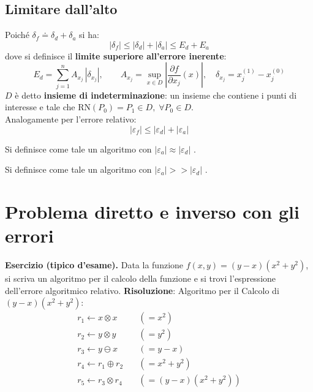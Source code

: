 \documentclass[12pt,a4paper,]{report}
\begin{document}
\subsection{Limitare dall'alto}

Poiché $\delta_f \doteq \delta_d + \delta_a$ si ha:
\[
|\delta_f| \leq |\delta_d| + |\delta_a| \leq E_d + E_a
\]
dove si definisce il \textbf{limite superiore all'errore inerente}:
\[
E_d = \sum_{j=1}^{n} A_{x_j}\,|\delta_{x_j}|,
\qquad
A_{x_j} = \sup_{x \in D}\left|\frac{\partial f}{\partial x_j}(x)\right|,
\quad
\delta_{x_j} = x_j^{(1)} - x_j^{(0)}
\]
$D$ è detto \textbf{insieme di indeterminazione}: un insieme che contiene i
punti di interesse e tale che $\mathrm{RN}(P_0) = P_1 \in D,\; \forall P_0 \in D$.
\\
Analogamente per l'errore relativo:
\[
|\varepsilon_f| \leq |\varepsilon_d| + |\varepsilon_a|
\]

\begin{definizione}
    Si definisce come tale un algoritmo con
    $
    |\varepsilon_a| \approx |\varepsilon_d|
    $
    .
\end{definizione}
\begin{definizione}
    Si definisce come tale un algoritmo con
    $
    |\varepsilon_a| >> |\varepsilon_d|
    $
    .
\end{definizione}


\begin{lezione}
    [Lezione 3 04/03]
\end{lezione}

\section{Problema diretto e inverso con gli errori}

\textbf{Esercizio (tipico d'esame).}
Data la funzione $f(x,y) = (y-x)(x^2+y^2)$, si scriva un algoritmo per il calcolo della funzione e si trovi l'espressione dell'errore algoritmico relativo.
\noindent
\textbf{Risoluzione}: Algoritmo per il Calcolo di $(y-x)(x^2+y^2)$:
\[
\begin{array}{ll}
r_1 \leftarrow x \otimes x & \quad (= x^2)\\
r_2 \leftarrow y \otimes y & \quad (= y^2)\\
r_3 \leftarrow y \ominus x & \quad (= y - x)\\
r_4 \leftarrow r_1 \oplus r_2 & \quad (= x^2 + y^2)\\
r_5 \leftarrow r_3 \otimes r_4 & \quad (= (y-x)(x^2+y^2))
\end{array}
\]
\end{document}
